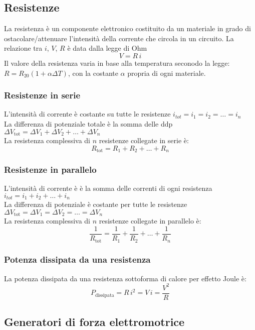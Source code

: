 \documentclass[a4paper]{article}
\begin{document}
\subsection{Resistenze}
La resistenza è un componente elettronico costituito da un materiale in grado di ostacolare/attenuare l'intensità della corrente
che circola in un circuito. La relazione tra \(i\), \(V\), \(R\) è data dalla legge di Ohm \[V = R \, i\]
Il valore della resistenza varia in base alla temperatura seconodo la legge: \(R = R_{20} (1 + \alpha \Delta T)\), con la costante
\(\alpha\) propria di ogni materiale.

\subsubsection*{Resistenze in serie}
L'intensità di corrente è costante su tutte le resistenze \(i_{tot} = i_1 = i_2 = \dots = i_n\) \\
La differenza di potenziale totale è la somma delle ddp \(\Delta V_\text{tot} = \Delta V_1 + \Delta V_2 + \dots + \Delta V_n\) \\
La resistenza complessiva di \(n\) resistenze collegate in serie è:
\[R_\text{tot} = R_1 + R_2 + \dots + R_n\]

\subsubsection*{Resistenze in parallelo}
L'intensità di corrente è è la somma delle correnti di ogni resistenza \(i_{tot} = i_1 + i_2 + \dots + i_n\) \\
La differenza di potenziale è costante per tutte le resistenze \(\Delta V_\text{tot} = \Delta V_1 = \Delta V_2 = \dots = \Delta V_n\) \\
La resistenza complessiva di \(n\) resistenze collegate in parallelo è:
\[\frac{1}{R_\text{tot}} = \frac{1}{R_1}+ \frac{1}{R_2} + \dots + \frac{1}{R_n}\]

\subsubsection*{Potenza dissipata da una resistenza}
La potenza dissipata da una resistenza sottoforma di calore per effetto Joule è:
\[P_\text{dissipata} = R \, i^2 = V \, i = \frac{V^2}{R}\]

\newpage

\subsection{Generatori di forza elettromotrice}
\end{document}
